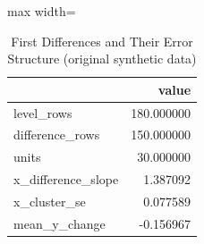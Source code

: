 \begin{table}[htbp]
\centering
\caption{First Differences and Their Error Structure (original synthetic data)}
\begingroup
\small
\setlength{\tabcolsep}{6pt}
\renewcommand{\arraystretch}{1.12}
\begin{adjustbox}{max width=\linewidth}
\begin{tabular}{@{}lr@{}}
\toprule
 & value \\
\midrule
level\_rows & 180.000000 \\
difference\_rows & 150.000000 \\
units & 30.000000 \\
x\_difference\_slope & 1.387092 \\
x\_cluster\_se & 0.077589 \\
mean\_y\_change & -0.156967 \\
\bottomrule
\end{tabular}
\end{adjustbox}
\endgroup
\end{table}
